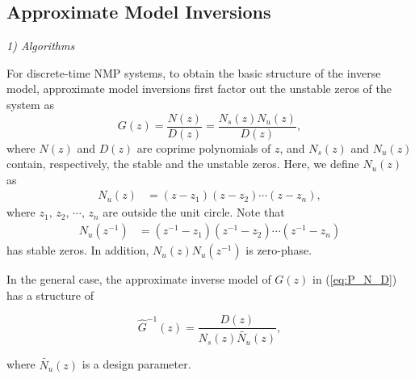 \documentclass [11pt, proquest] {uwthesis}[2020/02/24]
\begin{document}
\subsection{\label{subsec:Approximate-model-inversions}Approximate Model Inversions}

\noindent \emph{1) Algorithms}

For discrete-time NMP systems, to obtain the basic structure of the
inverse model, approximate model inversions \cite{butterworth_analysis_2012,dai2019quantitative,Butterworth2008,Tomizuka1987}
first factor out the unstable zeros of the system as
\begin{equation}
G(z)=\frac{N(z)}{D(z)}=\frac{N_{s}(z)N_{u}(z)}{D(z)},\label{eq:P_N_D}
\end{equation}
where $N(z)$ and $D(z)$ are coprime polynomials of $z$, and $N_{s}(z)$
and $N_{u}(z)$ contain, respectively, the stable and the unstable
zeros. Here, we define $N_{u}(z)$ as
\begin{align}
N_{u}(z) & =(z-z_{1})(z-z_{2})\cdots(z-z_{n}),\label{eq:N_zeros}
\end{align}
where $z_{1},\,z_{2},\,\cdots,\,z_{n}$ are outside the unit circle.
Note that
\begin{align*}
N_{u}(z^{-1}) & =(z^{-1}-z_{1})(z^{-1}-z_{2})\cdots(z^{-1}-z_{n})
\end{align*}
has stable zeros. In addition, $N_{u}(z)N_{u}(z^{-1})$ is zero-phase.

In the general case, the approximate inverse model of $G(z)$ in (\ref{eq:P_N_D})
has a structure of

\begin{equation}
\hat{G}^{-1}(z)=\frac{D(z)}{N_{s}(z)\tilde{N_{u}}(z)},\label{eq:G_hat_inv}
\end{equation}

\noindent where $\tilde{N_{u}}(z)$ is a design parameter.
\end{document}
